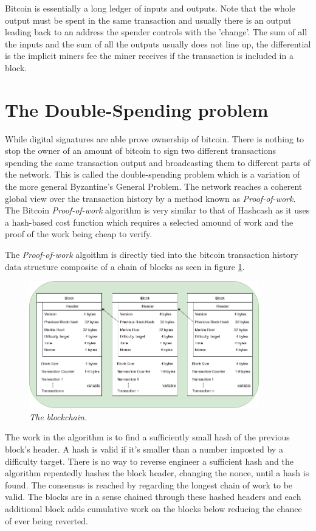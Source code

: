 Bitcoin is essentially a long ledger of inputs and outputs. Note that the whole output must be spent in the same transaction and usually there is an output leading back to an address the spender controls with the 'change'. The sum of all the inputs and the sum of all the outputs usually does not line up, the differential is the implicit miners fee the miner receives if the transaction is included in a block. 

\section{The Double-Spending problem}

While digital signatures are able prove ownership of bitcoin. There is nothing to stop the owner of an amount of bitcoin to sign two different transactions spending the same transaction output and broadcasting them to different parts of the network. This is called the double-spending problem which is a variation of the more general Byzantine's General Problem. The network reaches a coherent global view over the  transaction history by a method known as \textit{Proof-of-work}. The Bitcoin \textit{Proof-of-work} algorithm is very similar to that of Hashcash as it uses a hash-based cost function which requires a selected amound of work and the proof of the work being cheap to verify.

The \textit{Proof-of-work} algoithm is directly tied into the bitcoin transaction history data structure composite of a chain of blocks as seen in figure \ref{fig:blockchain}.

\begin{figure}[!htb]
	\hspace*{-2cm} 
	\centering
	\includegraphics[width=10cm]{blockchain.png}
	\caption{\textit{The blockchain. 
	}}
	\label{fig:blockchain}
	\hspace{2mm} 
\end{figure}

The work in the algorithm is to find a sufficiently small hash of the previous block's header. A hash is valid if it's smaller than a number imposted by a difficulty target. There is no way to reverse engineer a sufficient hash and the algorithm repeatedly hashes the block header, changing the nonce, until a hash is found. The consensus is reached by regarding the longest chain of work to be valid. The blocks are in a sense chained through these hashed headers and each additional block adds cumulative work on the blocks below reducing the chance of ever being reverted.

